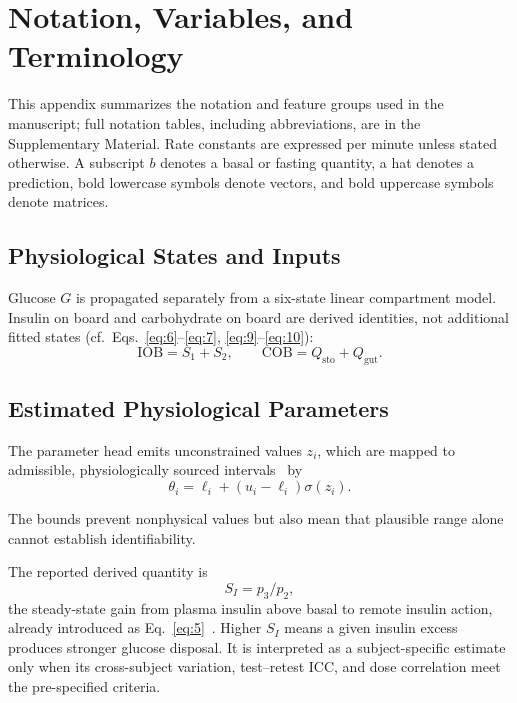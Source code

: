 \documentclass[journal]{IEEEtran}
\begin{document}
\makeatletter\newpage\if@firstcolumn\else\null\newpage\fi\makeatother
\appendices
\section{Notation, Variables, and Terminology}

This appendix summarizes the notation and feature groups used in the manuscript; full notation tables, including abbreviations, are in the Supplementary Material. Rate constants are expressed per minute unless stated otherwise. A subscript $b$ denotes a basal or fasting quantity, a hat denotes a prediction, bold lowercase symbols denote vectors, and bold uppercase symbols denote matrices.

\subsection{Physiological States and Inputs}

Glucose $G$ is propagated separately from a six-state linear compartment model. Insulin on board and carbohydrate on board are derived identities, not additional fitted states (cf.\ Eqs.~\eqref{eq:6}--\eqref{eq:7}, \eqref{eq:9}--\eqref{eq:10}):
\begin{equation}
\text{IOB} = S_1 + S_2, \qquad \text{COB} = Q_{\text{sto}} + Q_{\text{gut}}.
\label{eq:19}
\end{equation}

\subsection{Estimated Physiological Parameters}

The parameter head emits unconstrained values $z_i$, which are mapped to admissible, physiologically sourced intervals~\cite{ref33} by
\begin{equation}
\theta_i = \ell_i + (u_i - \ell_i)\sigma(z_i).
\label{eq:20}
\end{equation}

The bounds prevent nonphysical values but also mean that plausible range alone cannot establish identifiability.

The reported derived quantity is
\begin{equation}
S_I = p_3/p_2,
\label{eq:21}
\end{equation}
the steady-state gain from plasma insulin above basal to remote insulin action, already introduced as Eq.~\eqref{eq:5}~\cite{ref1,ref32}. Higher $S_I$ means a given insulin excess produces stronger glucose disposal. It is interpreted as a subject-specific estimate only when its cross-subject variation, test--retest ICC, and dose correlation meet the pre-specified criteria.
\end{document}
